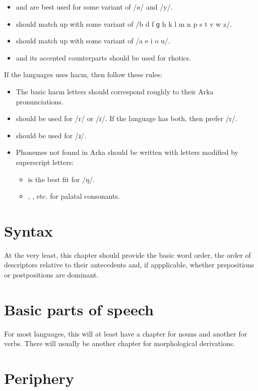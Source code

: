 \documentclass{book}
\begin{document}
\begin{itemize}
  \item {} and  are best used for some variant of /ø/ and /y/.
  \item {} should match up with some variant of /b d f ɡ h k l m n p s t v w z/.
  \item {} should match up with some variant of /a e i o u/.
  \item {} and its accented counterparts should be used for rhotics.
\end{itemize}

If the languages uses hacm, then follow these rules:

\begin{itemize}
  \item The basic hacm letters should correspond roughly to their Arka pronunciations.
  \item {} should be used for /r/ or /ɾ/. If the language has both, then prefer /r/.
  \item {} should be used for /ɹ/.
  \item Phonemes not found in Arka should be written with letters modified by superscript letters:
  \begin{itemize}
    \item {} is the best fit for /ŋ/.
    \item {}, , etc. for palatal consonants.
  \end{itemize}
\end{itemize}

\section{Syntax}

At the very least, this chapter should provide the basic word order, the order of descriptors relative to their antecedents and, if appplicable, whether prepositions or postpositions are dominant.

\section{Basic parts of speech}

For most languages, this will at least have a chapter for nouns and another for verbs. There will usually be another chapter for morphological derivations.

\section{Periphery}
\end{document}
